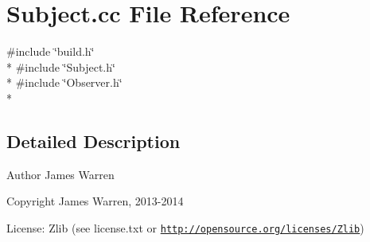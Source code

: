 \section{Subject.\-cc File Reference}
\label{_subject_8cc}
{\ttfamily \#include \char`\"{}build.\-h\char`\"{}}\\*
{\ttfamily \#include \char`\"{}Subject.\-h\char`\"{}}\\*
{\ttfamily \#include \char`\"{}Observer.\-h\char`\"{}}\\*


\subsection{Detailed Description}
\begin{DoxyAuthor}{Author}
James Warren 
\end{DoxyAuthor}
\begin{DoxyCopyright}{Copyright}
James Warren, 2013-\/2014 
\end{DoxyCopyright}
\begin{DoxyParagraph}{License\-:}
Zlib (see license.\-txt or \href{http://opensource.org/licenses/Zlib}{\tt http\-://opensource.\-org/licenses/\-Zlib}) 
\end{DoxyParagraph}
